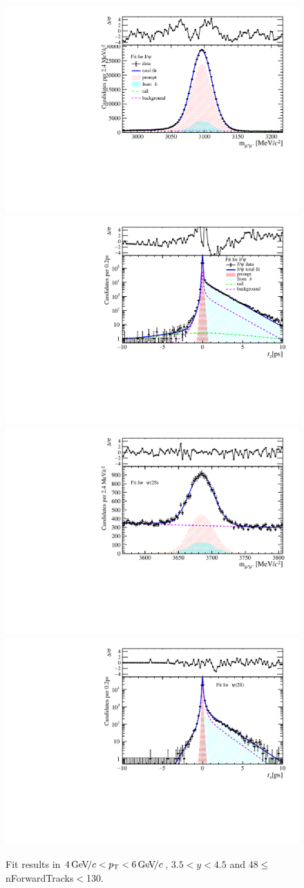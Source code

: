 \begin{figure}[H]
\begin{center}
\includegraphics[width=0.47\linewidth]{pdf/Jpsi/drawmassF/n5y3pt3.pdf}
\includegraphics[width=0.47\linewidth]{pdf/Jpsi/2DFitF/n5y3pt3.pdf}
\vspace*{-0.5cm}
\includegraphics[width=0.47\linewidth]{pdf/Psi2S/drawmassF/n5y3pt3.pdf}
\includegraphics[width=0.47\linewidth]{pdf/Psi2S/2DFitF/n5y3pt3.pdf}
\vspace*{-0.5cm}
\end{center}
\caption{Fit results in $4\text{\,Ge\kern -0.1em V\!/}c<p_{\mathrm{T}}<6\text{\,Ge\kern -0.1em V\!/}c$, $3.5<y<4.5$ and 48$\leq$nForwardTracks$<$130.}
\label{Fitn5y3pt3}
\end{figure}
